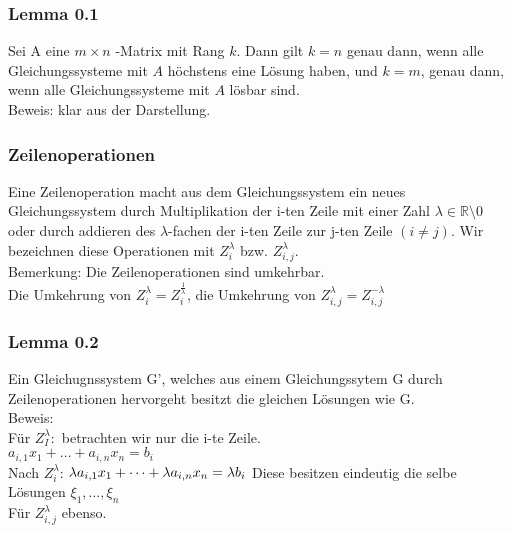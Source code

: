 \documentclass{article}
\newcommand{\lb}{\lambda}
\newcommand{\mlb}{$\lb$}
\newcommand{\R}{\mathbb{R}}
\begin{document}
\subsubsection{Lemma 0.1}
Sei A eine $m\times n$ -Matrix mit Rang $k$. Dann gilt $k=n$  genau dann, wenn alle Gleichungssysteme mit $A$ höchstens eine Lösung haben, und $k = m$, genau dann, wenn alle Gleichungssysteme mit $A$ lösbar sind.\\
Beweis: klar aus der Darstellung.\\

\subsubsection{Zeilenoperationen}
Eine Zeilenoperation macht aus dem Gleichungssystem ein neues Gleichungssystem durch Multiplikation  der i-ten Zeile mit einer Zahl $\lb \in \R \setminus 0$ oder durch addieren des \mlb -fachen der i-ten Zeile zur j-ten Zeile $(i \neq j)$. Wir bezeichnen diese Operationen mit $Z_i^\lb$ bzw. $Z_{i,j}^\lb$.\\
Bemerkung: Die Zeilenoperationen sind umkehrbar. \\
Die Umkehrung von $Z_i^\lb = Z_i^{\frac{1}{\lb}}$, die Umkehrung von $Z_{i,j}^\lb = Z_{i,j}^{-\lb}$

\subsubsection{Lemma 0.2}
Ein Gleichugnssystem G', welches aus einem Gleichungssytem G durch Zeilenoperationen hervorgeht besitzt die gleichen Lösungen wie G.\\
Beweis:\\
Für $Z_I^\lb: $ betrachten wir nur die i-te Zeile.\\
$a_{i,1}x_1 + \dots + a_{i,n}x_n = b_i$\\
Nach $Z_i^\lb$:
$\lb a_{i,1}x_1 + \dots + \lb a_{i,n}x_n = \lb b_i\\$
Diese besitzen eindeutig die selbe Lösungen $\xi_1, \dots, \xi_n$\\
Für $Z_{i,j}^\lb$ ebenso.
\end{document}

